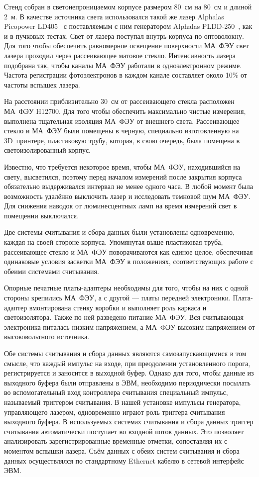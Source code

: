 Стенд собран в светонепроницаемом корпусе размером 80~см на 80~см и длиной 2~м. В качестве источника света использовался такой же лазер Alphalas Picopower LD405~\cite{ALPHALAS} с поставляемым с ним генератором Alphalas PLDD-250~\cite{ALPHALAS}, как и в пучковых тестах. Свет от лазера поступал внутрь корпуса по оптоволокну.
Для того чтобы обеспечить равномерное освещение поверхности МА~ФЭУ свет лазера проходил через рассеивающее матовое стекло.
Интенсивность лазера подобрана так, чтобы каналы МА~ФЭУ работали в одноэлектронном режиме. Частота регистрации фотоэлектронов в каждом канале составляет около 10\% от частоты вспышек лазера.

На расстоянии приблизительно 30~см от рассеивающего стекла расположен МА~ФЭУ H12700. Для того чтобы обеспечить максимально чистые измерения, выполнена тщательная изоляция МА~ФЭУ от внешнего света. Рассеивающее стекло и МА~ФЭУ были помещены в черную, специально изготовленную на 3D~принтере, пластиковую трубу, которая, в свою очередь, была помещена в светоизолированный корпус.

Известно, что требуется некоторое время, чтобы МА~ФЭУ, находившийся на свету, высветился, поэтому перед началом измерений после закрытия корпуса обязательно выдерживался интервал не менее одного часа. В любой момент была возможность удалённо выключить лазер и исследовать темновой шум МА~ФЭУ. Для снижения наводок от люминесцентных ламп на время измерений свет в помещении выключался.

Две системы считывания и сбора данных были установлены одновременно, каждая на своей стороне корпуса. Упомянутая выше пластиковая труба, рассеивающее стекло и МА~ФЭУ поворачиваются как единое целое, обеспечивая одинаковые условия засветки МА~ФЭУ в положениях, соответствующих работе с обеими системами считывания.

Опорные печатные платы-адаптеры необходимы для того, чтобы на них с одной стороны крепились МА~ФЭУ, а с другой --- платы передней электроники. Плата-адаптер вмонтирована стенку коробки и выполняет роль каркаса и светоизолятора. Также по ней разведено питание МА~ФЭУ. Вся считывающая электроника питалась низким напряжением, а МА~ФЭУ высоким напряжением от высоковольтного источника.

Обе системы считывания и сбора данных являются самозапускающимися в том смысле, что каждый импульс на входе, при преодолении установленного порога, регистрируется и заносится в выходной буфер. Однако для того, чтобы данные из выходного буфера были отправлены в ЭВМ, необходимо периодически посылать во вспомогательный вход контроллера считывания специальный импульс, называемый триггером считывания. В нашей установке импульсы генератора, управляющего лазером, одновременно играют роль триггера считывания выходного буфера. В используемых системах считывания и сбора данных триггер считывания автоматически поступает во входной поток данных. Это позволяет анализировать зарегистрированные временные отметки, сопоставляя их с моментом вспышки лазера. Съём данных с обеих систем считывания и сбора данных осуществлялся по стандартному Ethernet кабелю в сетевой интерфейс ЭВМ.
